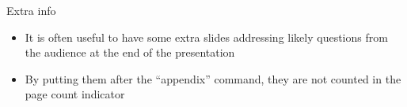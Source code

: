 \showqrcode

\appendix

\begin{frame}{Extra info}
  \begin{itemize}
    \item It is often useful to have some extra slides addressing likely questions from the audience at the end of the presentation
    \item By putting them after the ``appendix'' command, they are not counted in the page count indicator
  \end{itemize}
\end{frame}




\avisoApresentacao
